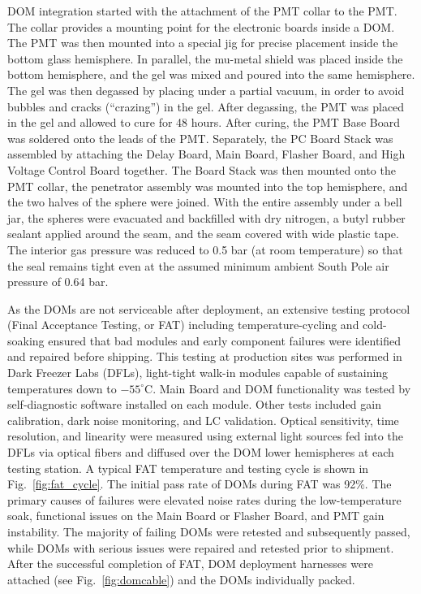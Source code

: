 DOM integration started with the attachment of the PMT collar
to the PMT.  The collar provides a mounting point for the electronic boards inside
a DOM. The PMT was then mounted into a special jig for precise
placement inside the bottom glass hemisphere.  In parallel, the mu-metal
shield was placed inside the bottom hemisphere, and the
gel was mixed and poured into the same hemisphere. The gel was then
degassed by placing under a partial vacuum, in order to avoid bubbles and
cracks (``crazing'') in the gel. 
After degassing, the PMT was placed in the gel and allowed to cure for 48
hours.  After curing, the PMT Base Board was soldered onto the leads of the
PMT.  Separately, the PC Board Stack was assembled by attaching the Delay
Board, Main Board, Flasher Board, and High Voltage Control Board together.
The Board Stack was then mounted onto the PMT collar, the penetrator assembly
was mounted into the top hemisphere, and the two halves of the sphere were
joined.  With the entire assembly under a bell jar, the spheres were
evacuated and backfilled with dry nitrogen, 
a butyl rubber sealant applied around the seam, and the seam covered with
wide plastic tape. The interior gas pressure was reduced to 0.5 bar (at
room temperature) so that the seal remains tight even at the assumed minimum
ambient South Pole air pressure of 0.64 bar.

As the DOMs are not serviceable after deployment, an extensive testing
protocol (Final Acceptance Testing, or FAT) including temperature-cycling
and cold-soaking ensured that bad modules and early component failures were
identified and repaired before shipping.  This testing at production sites
was performed in Dark Freezer Labs (DFLs), light-tight walk-in 
modules capable of sustaining temperatures down to $-55^\circ$C.  Main Board
and DOM functionality was tested by self-diagnostic software installed on
each module.  Other tests included gain calibration, dark noise monitoring,
and LC validation.  Optical sensitivity, time resolution,
and linearity were measured using external light sources fed into the DFLs
via optical fibers and diffused over the DOM lower hemispheres at each
testing station.  A typical FAT temperature and testing cycle is shown in
Fig.~\ref{fig:fat_cycle}. The initial pass rate of DOMs during FAT was
92\%.  The primary causes of failures were elevated noise rates during the
low-temperature soak, functional issues on the Main Board or Flasher Board,
and PMT gain instability.  The majority of failing DOMs were retested and
subsequently passed, while DOMs with serious issues were repaired and
retested prior to shipment. After the successful completion of FAT, DOM
deployment harnesses were attached (see Fig.~\ref{fig:domcable}) and the DOMs individually packed. 

